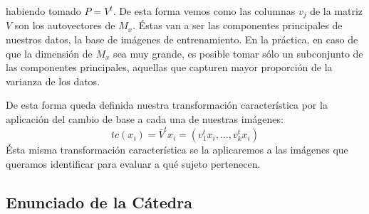 habiendo tomado $P = V^t$. De esta forma vemos como las columnas $v_j$ de la matriz $V$ son los autovectores de $M_x$. Éstas van a ser
las componentes principales de nuestros datos, la base de imágenes de entrenamiento. En la práctica, en caso de que la dimensión 
de $M_x$ sea muy grande, es posible tomar sólo un subconjunto de las componentes principales, aquellas que capturen mayor proporción
de la varianza de los datos.
\par
De esta forma queda definida nuestra transformación característica por la aplicación del cambio de base a cada una de nuestras imágenes:
\begin{displaymath}
 tc(x_i) = \bar{V}^{t}x_i = (v_1^{t}x_i,...,v_k^{t}x_i)
\end{displaymath}
Ésta misma transformación característica se la aplicaremos a las imágenes que queramos identificar para evaluar a qué sujeto pertenecen.

\newpage
\subsection{Enunciado de la Cátedra}


